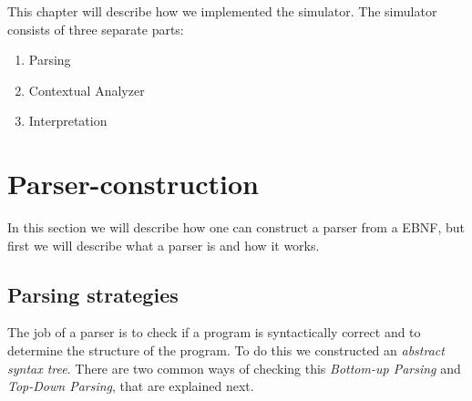 This chapter will describe how we implemented the simulator. The simulator consists of three separate parts: \\
\begin{enumerate}
	\item Parsing
	\item Contextual Analyzer
	\item Interpretation
\end{enumerate}

\section{Parser-construction}
	In this section we will describe how one can construct a parser from a EBNF, but first we will describe what a parser is and how it works.
	
	\subsection{Parsing strategies}
		The job of a parser is to check if a program is syntactically correct and 
		to determine the structure of the program. To do this we constructed an {\it abstract syntax tree}.
		There are two common ways of checking this {\it Bottom-up Parsing} and {\it Top-Down Parsing}, that are explained next.
		
